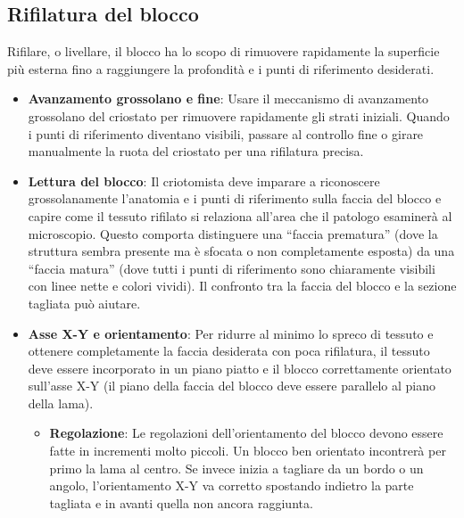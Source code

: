 \subsection{Rifilatura del blocco}

Rifilare, o livellare, il blocco ha lo scopo di rimuovere rapidamente la superficie più esterna fino a raggiungere la profondità e i punti di riferimento desiderati.

\begin{itemize}
\item \textbf{Avanzamento grossolano e fine}: Usare il meccanismo di avanzamento grossolano del criostato per rimuovere rapidamente gli strati iniziali. Quando i punti di riferimento diventano visibili, passare al controllo fine o girare manualmente la ruota del criostato per una rifilatura precisa.

\item \textbf{Lettura del blocco}: Il criotomista deve imparare a riconoscere grossolanamente l'anatomia e i punti di riferimento sulla faccia del blocco e capire come il tessuto rifilato si relaziona all'area che il patologo esaminerà al microscopio. Questo comporta distinguere una “faccia prematura” (dove la struttura sembra presente ma è sfocata o non completamente esposta) da una “faccia matura” (dove tutti i punti di riferimento sono chiaramente visibili con linee nette e colori vividi). Il confronto tra la faccia del blocco e la sezione tagliata può aiutare. 

\item \textbf{Asse X-Y e orientamento}: Per ridurre al minimo lo spreco di tessuto e ottenere completamente la faccia desiderata con poca rifilatura, il tessuto deve essere incorporato in un piano piatto e il blocco correttamente orientato sull'asse X-Y (il piano della faccia del blocco deve essere parallelo al piano della lama).
\begin{itemize}
    \item \textbf{Regolazione}: Le regolazioni dell'orientamento del blocco devono essere fatte in incrementi molto piccoli. Un blocco ben orientato incontrerà per primo la lama al centro. Se invece inizia a tagliare da un bordo o un angolo, l'orientamento X-Y va corretto spostando indietro la parte tagliata e in avanti quella non ancora raggiunta. 
\end{itemize}


\end{itemize}
